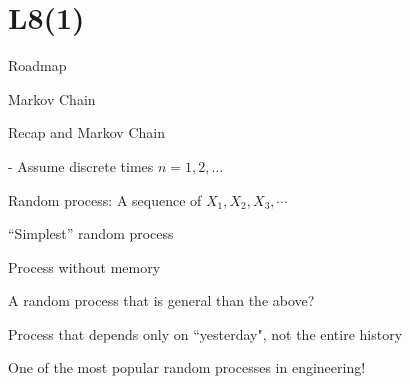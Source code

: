 \section{L8(1)}
\begin{frame}{Roadmap}

{\Large Markov Chain}


  \plitemsep 0.1in

\bce[(1)]



\item {}

\item {}



\ece 

\end{frame}

\begin{frame}{Recap and Markov Chain}

- Assume discrete times $n=1, 2, \ldots$
\vspace{-0.3cm}

\plitemsep 0.05in
\bci 
\item Random process: A sequence of $X_1, X_2, X_3, \cdots $

\item<2-> ``Simplest'' random process

\bci
\item<3-> Process without memory
\item<4-> 
\eci

\item<5-> A random process that is  general  than the above?
\bci
\item<6-> Process that depends only on ``yesterday", not the entire history

\item<7-> 

\item<7-> One of the most popular random processes in engineering!
\eci

\eci 
\end{frame}

